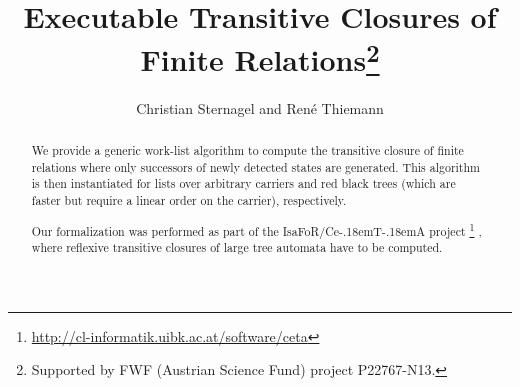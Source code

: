 \documentclass[11pt,a4paper]{article}
\newcommand\isafor{\textsf{IsaFoR}}
\newcommand\ceta{\textsf{Ce\kern-.18emT\kern-.18emA}}
\begin{document}
\title{Executable Transitive Closures of Finite Relations\footnote{Supported by FWF (Austrian Science Fund) project P22767-N13.}}
\author{Christian Sternagel and Ren\'e Thiemann}
\maketitle

\begin{abstract}
  We provide a generic work-list algorithm to compute the transitive closure of
  finite relations where only successors of newly detected states are generated.
  This algorithm is then instantiated for lists over arbitrary carriers and red
  black trees \cite{rbt} (which are faster but require a linear order on the
  carrier), respectively. 

  Our formalization was performed as part of the \isafor/\ceta{} project%
  \footnote{\url{http://cl-informatik.uibk.ac.at/software/ceta}} \cite{CeTA},
  where reflexive transitive closures of large tree automata have to be
  computed.
\end{abstract}

\tableofcontents








\end{document}
